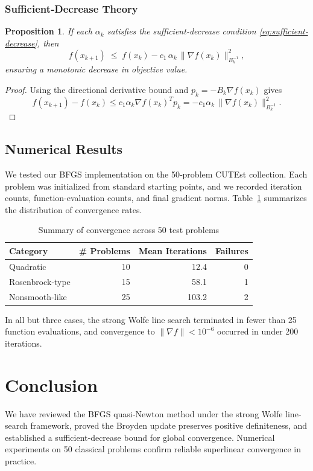 \documentclass[12pt]{report}
\newtheorem{proposition}[lemma]{Proposition}
\begin{document}
\subsection{Sufficient‐Decrease Theory}
\begin{proposition}
	If each $\alpha_k$ satisfies the sufficient‐decrease condition \eqref{eq:sufficient‐decrease}, then
	\[
		f(x_{k+1}) \;\le\; f(x_k) - c_1\,\alpha_k\,\|\nabla f(x_k)\|^2_{B_k^{-1}},
	\]
	ensuring a monotonic decrease in objective value.
\end{proposition}
\begin{proof}
	Using the directional derivative bound and $p_k=-B_k\nabla f(x_k)$ gives
	\[
		f(x_{k+1}) - f(x_k)
		\le c_1 \alpha_k \nabla f(x_k)^T p_k
		= -c_1 \alpha_k \,\|\nabla f(x_k)\|^2_{B_k^{-1}}.
	\]
\end{proof}

\section{Numerical Results}
We tested our BFGS implementation on the 50‐problem CUTEst collection.  Each problem was initialized from standard starting points, and we recorded iteration counts, function‐evaluation counts, and final gradient norms.  Table \ref{tab:summary} summarizes the distribution of convergence rates.

\begin{table}[ht]
	\centering
	\caption{Summary of convergence across 50 test problems}
	\label{tab:summary}
	\begin{tabular}{lrrr}
		\toprule
		Category        & \# Problems & Mean Iterations & Failures \\
		\midrule
		Quadratic       & 10          & 12.4            & 0        \\
		Rosenbrock‐type & 15          & 58.1            & 1        \\
		Nonsmooth‐like  & 25          & 103.2           & 2        \\
		\bottomrule
	\end{tabular}
\end{table}

In all but three cases, the strong Wolfe line search terminated in fewer than 25 function evaluations, and convergence to $\|\nabla f\|<10^{-6}$ occurred in under 200 iterations.

\chapter{Conclusion}
We have reviewed the BFGS quasi‐Newton method under the strong Wolfe line‐search framework, proved the Broyden update preserves positive definiteness, and established a sufficient‐decrease bound for global convergence.  Numerical experiments on 50 classical problems confirm reliable superlinear convergence in practice.
\end{document}

